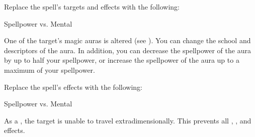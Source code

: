 


Replace the spell's targets and effects with the following:
\begin{spellcontent}

\begin{augmenttargetinginfo}




\end{augmenttargetinginfo}


\begin{augmenteffects}




\begin{spellattack}{Spellpower vs. Mental}


\hit
One of the target's magic auras is altered (see ).
You can change the school and descriptors of the aura.
In addition, you can decrease the spellpower of the aura by up to half your spellpower, or increase the spellpower of the aura up to a maximum of your spellpower.



\end{spellattack}





\end{augmenteffects}

\end{spellcontent}








Replace the spell's effects with the following:
\begin{spellcontent}

\begin{augmenteffects}




\begin{spellattack}{Spellpower vs. Mental}


\hit
As a , the target is unable to travel extradimensionally.
This prevents all , , and  effects.



\end{spellattack}





\end{augmenteffects}

\end{spellcontent}






